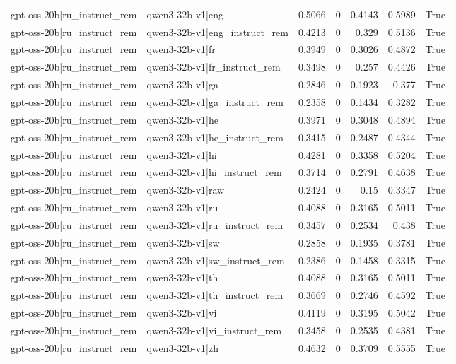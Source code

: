 \begin{table}
\begin{tabular}{l l r r r r l}
gpt-oss-20b|ru_instruct_rem & qwen3-32b-v1|eng & 0.5066 & 0 & 0.4143 & 0.5989 & True \\
gpt-oss-20b|ru_instruct_rem & qwen3-32b-v1|eng_instruct_rem & 0.4213 & 0 & 0.329 & 0.5136 & True \\
gpt-oss-20b|ru_instruct_rem & qwen3-32b-v1|fr & 0.3949 & 0 & 0.3026 & 0.4872 & True \\
gpt-oss-20b|ru_instruct_rem & qwen3-32b-v1|fr_instruct_rem & 0.3498 & 0 & 0.257 & 0.4426 & True \\
gpt-oss-20b|ru_instruct_rem & qwen3-32b-v1|ga & 0.2846 & 0 & 0.1923 & 0.377 & True \\
gpt-oss-20b|ru_instruct_rem & qwen3-32b-v1|ga_instruct_rem & 0.2358 & 0 & 0.1434 & 0.3282 & True \\
gpt-oss-20b|ru_instruct_rem & qwen3-32b-v1|he & 0.3971 & 0 & 0.3048 & 0.4894 & True \\
gpt-oss-20b|ru_instruct_rem & qwen3-32b-v1|he_instruct_rem & 0.3415 & 0 & 0.2487 & 0.4344 & True \\
gpt-oss-20b|ru_instruct_rem & qwen3-32b-v1|hi & 0.4281 & 0 & 0.3358 & 0.5204 & True \\
gpt-oss-20b|ru_instruct_rem & qwen3-32b-v1|hi_instruct_rem & 0.3714 & 0 & 0.2791 & 0.4638 & True \\
gpt-oss-20b|ru_instruct_rem & qwen3-32b-v1|raw & 0.2424 & 0 & 0.15 & 0.3347 & True \\
gpt-oss-20b|ru_instruct_rem & qwen3-32b-v1|ru & 0.4088 & 0 & 0.3165 & 0.5011 & True \\
gpt-oss-20b|ru_instruct_rem & qwen3-32b-v1|ru_instruct_rem & 0.3457 & 0 & 0.2534 & 0.438 & True \\
gpt-oss-20b|ru_instruct_rem & qwen3-32b-v1|sw & 0.2858 & 0 & 0.1935 & 0.3781 & True \\
gpt-oss-20b|ru_instruct_rem & qwen3-32b-v1|sw_instruct_rem & 0.2386 & 0 & 0.1458 & 0.3315 & True \\
gpt-oss-20b|ru_instruct_rem & qwen3-32b-v1|th & 0.4088 & 0 & 0.3165 & 0.5011 & True \\
gpt-oss-20b|ru_instruct_rem & qwen3-32b-v1|th_instruct_rem & 0.3669 & 0 & 0.2746 & 0.4592 & True \\
gpt-oss-20b|ru_instruct_rem & qwen3-32b-v1|vi & 0.4119 & 0 & 0.3195 & 0.5042 & True \\
gpt-oss-20b|ru_instruct_rem & qwen3-32b-v1|vi_instruct_rem & 0.3458 & 0 & 0.2535 & 0.4381 & True \\
gpt-oss-20b|ru_instruct_rem & qwen3-32b-v1|zh & 0.4632 & 0 & 0.3709 & 0.5555 & True \\

\end{tabular}
\end{table}
